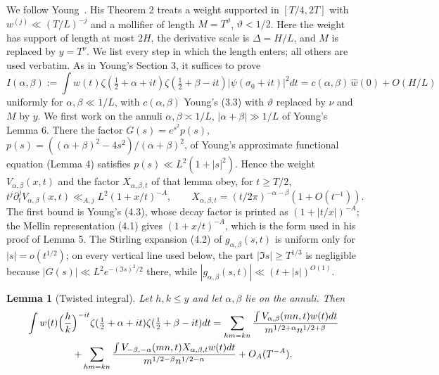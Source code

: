 \documentclass[11pt]{article}
\newtheorem{lemma}[theorem]{Lemma}
\theoremstyle{remark}
\newcommand{\wh}{\widehat w(0)}
\begin{document}
We follow Young~\cite{Young}. His Theorem 2 treats a weight supported in
$[T/4,2T]$ with $w^{(j)}\ll(T/L)^{-j}$ and a mollifier of length $M=T^{\vartheta}$,
$\vartheta<1/2$. Here the weight has support of length at most $2H$, the
derivative scale is $\Delta=H/L$, and $M$ is replaced by $y=T^\nu$. We list
every step in which the length enters; all others are used verbatim. As in
Young's Section 3, it suffices to prove
\begin{equation}\label{eq:Iab}
 I(\alpha,\beta):=\int w(t)\zeta(\tfrac12+\alpha+it)\zeta(\tfrac12+\beta-it)
 |\psi(\sigma_0+it)|^2dt=c(\alpha,\beta)\,\wh+O(H/L)
\end{equation}
uniformly for $\alpha,\beta\ll1/L$, with $c(\alpha,\beta)$ Young's (3.3)
with $\vartheta$ replaced by $\nu$ and $M$ by $y$. We first work on the annuli
$\alpha,\beta\asymp1/L$, $|\alpha+\beta|\gg1/L$ of Young's Lemma 6. There the
factor $G(s)=e^{s^2}p(s)$, $p(s)=((\alpha+\beta)^2-4s^2)/(\alpha+\beta)^2$, of
Young's approximate functional equation (Lemma 4) satisfies
$p(s)\ll L^2(1+|s|^2)$. Hence the weight $V_{\alpha,\beta}(x,t)$ and the
factor $X_{\alpha,\beta,t}$ of that lemma obey, for $t\ge T/2$,
\begin{equation}\label{eq:Vbound}
 t^j\partial_t^jV_{\alpha,\beta}(x,t)\ll_{A,j}L^2(1+x/t)^{-A},\qquad
 X_{\alpha,\beta,t}=(t/2\pi)^{-\alpha-\beta}(1+O(t^{-1})).
\end{equation}
The first bound is Young's (4.3), whose decay factor is printed as
$(1+|t/x|)^{-A}$; the Mellin representation (4.1) gives $(1+x/t)^{-A}$,
which is the form used in his proof of Lemma 5. The Stirling expansion (4.2)
of $g_{\alpha,\beta}(s,t)$ is uniform only for $|s|=o(t^{1/2})$; on every
vertical line used below, the part $|\Im s|\ge T^{1/3}$ is negligible because
$|G(s)|\ll L^2e^{-(\Im s)^2/2}$ there, while
$|g_{\alpha,\beta}(s,t)|\ll(t+|s|)^{O(1)}$.

\begin{lemma}[Twisted integral]\label{lem:twisted}
Let $h,k\le y$ and let $\alpha,\beta$ lie on the annuli. Then
\begin{multline*}
 \int w(t)\Bigl(\frac hk\Bigr)^{-it}\zeta(\tfrac12+\alpha+it)\zeta(\tfrac12+\beta-it)dt
 =\sum_{hm=kn}\frac{\int V_{\alpha,\beta}(mn,t)w(t)dt}{m^{1/2+\alpha}n^{1/2+\beta}}\\
 +\sum_{hm=kn}\frac{\int V_{-\beta,-\alpha}(mn,t)X_{\alpha,\beta,t}w(t)dt}{m^{1/2-\beta}n^{1/2-\alpha}}
 +O_A(T^{-A}).
\end{multline*}
\end{lemma}
\end{document}
